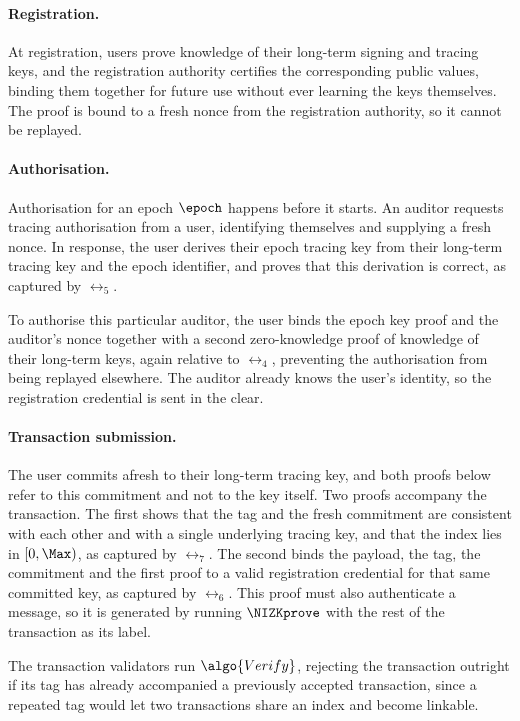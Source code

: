 \paragraph{Registration.} At registration, users prove knowledge of their
long-term signing and tracing keys, and the registration authority certifies the
corresponding public values, binding them together for future use without ever
learning the keys themselves. The proof is bound to a fresh nonce from the
registration authority, so it cannot be replayed.

\paragraph{Authorisation.} Authorisation for an epoch $\epoch$ happens before it starts. An auditor
requests tracing authorisation from a user, identifying themselves and supplying
a fresh nonce. In response, the user derives their epoch tracing key from their
long-term tracing key and the epoch identifier, and proves that this derivation
is correct, as captured by $\rel_5$.

To authorise this particular auditor, the user binds the epoch key proof and the
auditor's nonce together with a second zero-knowledge proof of knowledge of
their long-term keys, again relative to $\rel_4$, preventing the authorisation
from being replayed elsewhere. The auditor already knows the user's identity, so the registration credential is
sent in the clear.

\paragraph{Transaction submission.} The user commits afresh to their long-term
tracing key, and both proofs below refer to this commitment and not to the key
itself. Two proofs accompany the transaction. The first shows that the tag and the fresh
commitment are consistent with each other and with a single underlying tracing
key, and that the index lies in $[0,\Max)$, as captured by $\rel_7$. The
second binds the payload, the tag, the commitment and the first proof to a valid
registration credential for that same committed key, as captured by $\rel_6$.
This proof must also authenticate a message, so it is generated by running
$\NIZKprove$ with the rest of the transaction as its label.

The transaction validators run $\algo{Verify}$, rejecting the transaction
outright if its tag has already accompanied a previously accepted transaction,
since a repeated tag would let two transactions share an index and become
linkable.

